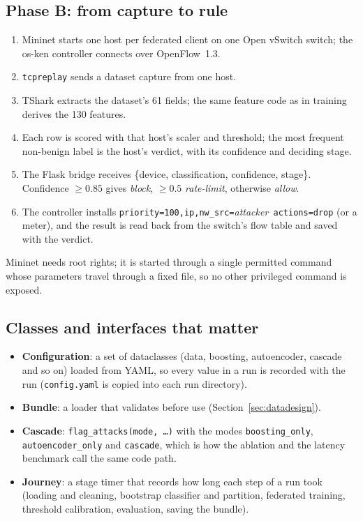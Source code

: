 \subsection{Phase B: from capture to rule}
\begin{enumerate}
  \item Mininet starts one host per federated client on one Open vSwitch switch; the os-ken controller connects over OpenFlow~1.3.
  \item \texttt{tcpreplay} sends a dataset capture from one host.
  \item TShark extracts the dataset's 61 fields; the same feature code as in training derives the 130 features.
  \item Each row is scored with that host's scaler and threshold; the most frequent non-benign label is the host's verdict, with its confidence and deciding stage.
  \item The Flask bridge receives \{device, classification, confidence, stage\}. Confidence $\ge0.85$ gives \emph{block}, $\ge0.5$ \emph{rate-limit}, otherwise \emph{allow}.
  \item The controller installs \texttt{priority=100,ip,nw\_src=}\emph{attacker}\texttt{ actions=drop} (or a meter), and the result is read back from the switch's flow table and saved with the verdict.
\end{enumerate}
Mininet needs root rights; it is started through a single permitted command whose parameters travel through a fixed file, so no other privileged command is exposed.

\subsection{Classes and interfaces that matter}
\begin{itemize}
  \item \textbf{Configuration}: a set of dataclasses (data, boosting, autoencoder, cascade and so on) loaded from YAML, so every value in a run is recorded with the run (\texttt{config.yaml} is copied into each run directory).
  \item \textbf{Bundle}: a loader that validates before use (Section~\ref{sec:datadesign}).
  \item \textbf{Cascade}: \texttt{flag\_attacks(mode, \ldots)} with the modes \texttt{boosting\_only}, \texttt{autoencoder\_only} and \texttt{cascade}, which is how the ablation and the latency benchmark call the same code path.
  \item \textbf{Journey}: a stage timer that records how long each step of a run took (loading and cleaning, bootstrap classifier and partition, federated training, threshold calibration, evaluation, saving the bundle).
\end{itemize}

